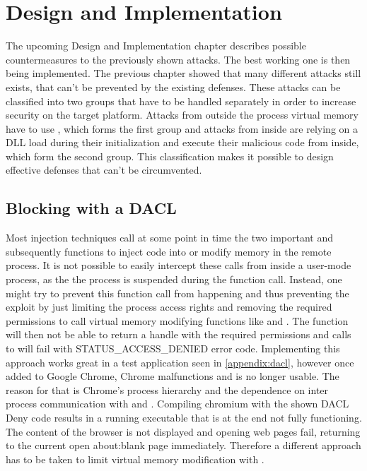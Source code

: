 \section{Design and Implementation}
The upcoming Design and Implementation chapter describes possible countermeasures to the previously shown attacks. The best working one is then being implemented.
\label{sec:implementation}
The previous chapter showed that many different attacks still exists, that can't be prevented by the existing defenses. These attacks can be classified into two groups that have to be handled separately in order to increase security on the target platform. Attacks from outside the process virtual memory have to use , which forms the first group and attacks from inside are relying on a DLL load during their initialization and execute their malicious code from inside, which form the second group. This classification makes it possible to design effective defenses that can't be circumvented. 

\subsection{Blocking  with a DACL}
\label{sec:implementation_dacl}
Most injection techniques call at some point in time the two important  and subsequently  functions to inject code into or modify memory in the remote process. It is not possible to easily intercept these calls from inside a user-mode process, as the the process is suspended during the  function call. Instead, one might try to prevent this function call from happening and thus preventing the exploit by just limiting the process access rights and removing the required permissions to call virtual memory modifying functions like  and . The  function will then not be able to return a handle with the required permissions and calls to  will fail with STATUS\_ACCESS\_DENIED error code. Implementing this approach works great in a test application seen in \ref{appendix:dacl}, however once added to Google Chrome, Chrome malfunctions and is no longer usable. The reason for that is Chrome's process hierarchy and the dependence on inter process communication with  and . Compiling chromium with the shown DACL Deny code results in a running executable that is at the end not fully functioning. The content of the browser is not displayed and opening web pages fail, returning to the current open about:blank page immediately. Therefore a different approach has to be taken to limit virtual memory modification with .

